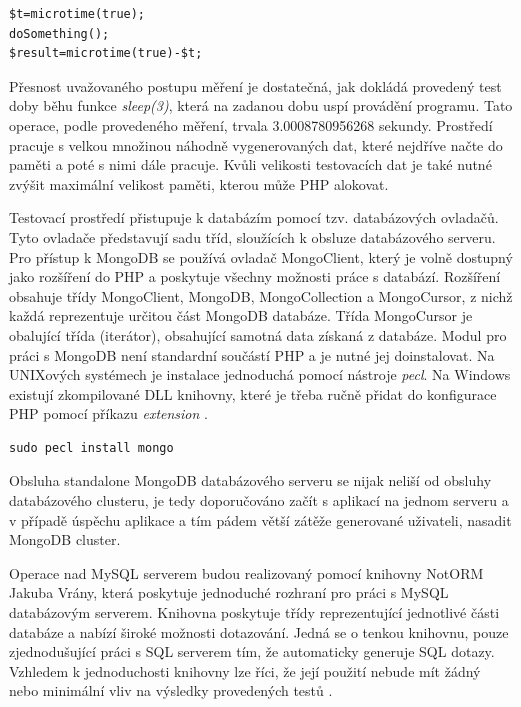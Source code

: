 \begin{lstlisting}[caption={Ukázka kódu provádějícího měření}]
$t=microtime(true);
doSomething();
$result=microtime(true)-$t;
\end{lstlisting}

Přesnost uvažovaného postupu měření je dostatečná, jak dokládá provedený test doby běhu funkce \emph{sleep(3)}, která na zadanou dobu uspí provádění programu. Tato operace, podle provedeného měření, trvala 3.0008780956268 sekundy. Prostředí pracuje s velkou množinou náhodně vygenerovaných dat, které nejdříve načte do paměti a poté s nimi dále pracuje. Kvůli velikosti testovacích dat je také nutné zvýšit maximální velikost paměti, kterou může PHP alokovat.

Testovací prostředí přistupuje k databázím pomocí tzv. databázových ovladačů. Tyto ovladače představují sadu tříd, sloužících k obsluze databázového serveru. Pro přístup k MongoDB se používá ovladač MongoClient, který je volně dostupný jako rozšíření do PHP a poskytuje všechny možnosti práce s databází. Rozšíření obsahuje třídy MongoClient, MongoDB, MongoCollection a MongoCursor, z nichž každá reprezentuje určitou část MongoDB databáze. Třída MongoCursor je obalující třída (iterátor), obsahující samotná data získaná z  databáze. Modul pro práci s MongoDB není standardní součástí PHP a je nutné jej doinstalovat. Na UNIXových systémech je instalace jednoduchá pomocí nástroje \emph{pecl}. Na Windows existují zkompilované DLL knihovny, které je třeba ručně přidat do konfigurace PHP pomocí příkazu \emph{extension} \cite{phpMongo}. 

\begin{lstlisting}[caption={Instalace MongoDB rozšíření do PHP na UNIXových systémech}]
sudo pecl install mongo
\end{lstlisting}
Obsluha standalone MongoDB databázového serveru se nijak neliší od obsluhy databázového clusteru, je tedy doporučováno začít s aplikací na jednom serveru a v případě úspěchu aplikace a tím pádem větší zátěže generované uživateli, nasadit MongoDB cluster.

Operace nad MySQL serverem budou realizovaný pomocí knihovny NotORM Jakuba Vrány, která poskytuje jednoduché rozhraní pro práci s MySQL databázovým serverem. Knihovna poskytuje třídy reprezentující jednotlivé části databáze a nabízí široké možnosti dotazování. Jedná se o tenkou knihovnu, pouze zjednodušující práci s SQL serverem tím, že automaticky generuje SQL dotazy. Vzhledem k jednoduchosti knihovny lze říci, že její použití nebude mít žádný nebo minimální vliv na výsledky provedených testů \cite{notOrm}. 

